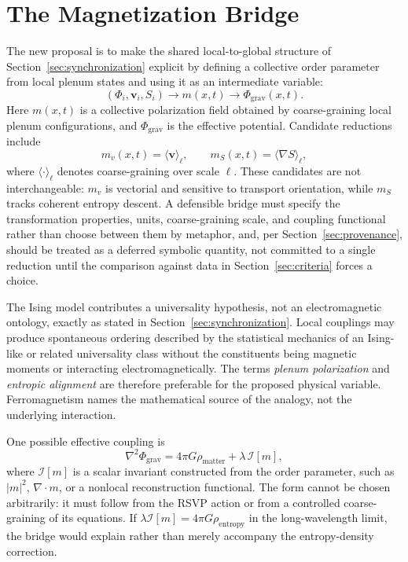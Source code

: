 \documentclass[11pt]{article}
\begin{document}
\section{The Magnetization Bridge}
\label{sec:bridge}

The new proposal is to make the shared local-to-global structure of Section~\ref{sec:synchronization} explicit by defining a collective order parameter from local plenum states and using it as an intermediate variable:
\[
(\Phi_i,\mathbf{v}_i,S_i)
\longrightarrow m(x,t)
\longrightarrow\Phi_{\mathrm{grav}}(x,t).
\]
Here $m(x,t)$ is a collective polarization field obtained by coarse-graining local plenum configurations, and $\Phi_{\mathrm{grav}}$ is the effective potential. Candidate reductions include
\[
m_v(x,t)=\bigl\langle\mathbf{v}\bigr\rangle_{\ell},
\qquad
m_S(x,t)=\bigl\langle\nabla S\bigr\rangle_{\ell},
\]
where $\langle\cdot\rangle_\ell$ denotes coarse-graining over scale $\ell$. These candidates are not interchangeable: $m_v$ is vectorial and sensitive to transport orientation, while $m_S$ tracks coherent entropy descent. A defensible bridge must specify the transformation properties, units, coarse-graining scale, and coupling functional rather than choose between them by metaphor, and, per Section~\ref{sec:provenance}, should be treated as a deferred symbolic quantity, not committed to a single reduction until the comparison against data in Section~\ref{sec:criteria} forces a choice.

The Ising model contributes a universality hypothesis, not an electromagnetic ontology, exactly as stated in Section~\ref{sec:synchronization}. Local couplings may produce spontaneous ordering described by the statistical mechanics of an Ising-like or related universality class without the constituents being magnetic moments or interacting electromagnetically. The terms \emph{plenum polarization} and \emph{entropic alignment} are therefore preferable for the proposed physical variable. Ferromagnetism names the mathematical source of the analogy, not the underlying interaction.

One possible effective coupling is
\[
\nabla^2\Phi_{\mathrm{grav}}
=4\pi G\rho_{\mathrm{matter}}+\lambda\,\mathcal{I}[m],
\]
where $\mathcal{I}[m]$ is a scalar invariant constructed from the order parameter, such as $|m|^2$, $\nabla\cdot m$, or a nonlocal reconstruction functional. The form cannot be chosen arbitrarily: it must follow from the RSVP action or from a controlled coarse-graining of its equations. If $\lambda\mathcal{I}[m]=4\pi G\rho_{\mathrm{entropy}}$ in the long-wavelength limit, the bridge would explain rather than merely accompany the entropy-density correction.
\end{document}
